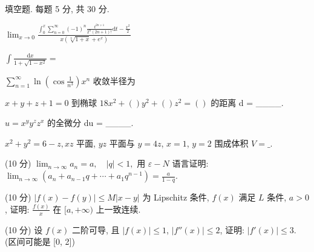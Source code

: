 \par{}
填空题. 每题 5 分, 共 30 分.\par
$\lim_{x\to 0}\frac{\int_0^x\sum_{n = 0}^\infty(-1)^n\frac{t^{2n + 1}}{2^n(2n + 1)!}\mathrm{d}t - \frac{x^2}{2}}{x(\sqrt[3]{1 + x} + e^x)}$\par
$\int \frac{\mathrm{d}x}{1 + \sqrt{1 - x^2}} =$\par
$\sum_{n=1}^{\infty} \ln \left( \cos \frac{1}{n^3} \right) x^n$ 收敛半径为\par
$x + y + z + 1 = 0$  到椭球  $18x^{2} + ()y^{2} + ()z^{2} = ()$  的距离 d = \_\_\_\_.\par
$u = x^{y} y^{z} z^{x}$  的全微分 du = \_\_\_\_.\par
$x^{2} + y^{2} = 6 - z, xz$ 平面, $yz$ 平面与 $y = 4z$, $x = 1$, $y = 2$ 围成体积 $V = \_$.\par
\par{}
(10 分)  $\lim_{n\to\infty}a_n=a,\quad|q|<1,$  用  $\varepsilon-N$  语言证明:  $\lim_{n\to\infty}(a_n+a_{n-1}q+\cdots+a_1q^{n-1})=\frac{a}{1-q}.$\par
\par{}
(10 分) $|f(x) - f(y)| \leq M|x - y|$ 为 Lipschitz 条件, $f(x)$ 满足 $L$ 条件, $a > 0$, 证明: $\frac{f(x)}{x}$ 在 $[a, +\infty)$ 上一致连续.\par
\par{}
(10 分) 设 $f(x)$ 二阶可导, 且 $|f(x)| \leq 1$, $|f''(x)| \leq 2$, 证明: $|f'(x)| \leq 3$. (区间可能是 [0, 2])\par
\par{}
